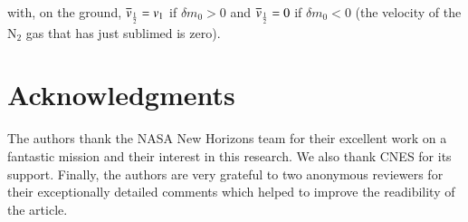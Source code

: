 with, on the ground,
$\overline{v}_{\frac{1}{2}} = v_1$ if $\delta m_0 > 0$
and  $\overline{v}_{\frac{1}{2}} = 0$ if $\delta m_0 < 0$
(the velocity of the N$_2$ gas that has just sublimed is zero).










\section*{Acknowledgments}

The authors thank the NASA New Horizons team for their excellent work on a fantastic
mission and their interest in this research. We also thank CNES for its support. 
Finally, the authors are very grateful to two anonymous reviewers for their
exceptionally detailed comments which helped to improve the readibility of the article.


